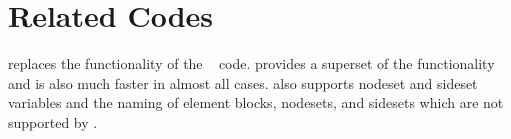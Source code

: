 \section{Related Codes}
\epu{} replaces the functionality of the
~\cite{bib:nem_join} code.  \epu{} provides a superset of
the  functionality and is also much faster in almost
all cases.  \epu{} also supports nodeset and sideset variables and the
naming of element blocks, nodesets, and sidesets which are not
supported by .
